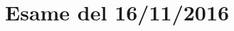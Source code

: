 \documentclass[\main/main.tex]{subfiles}
\begin{document}
\section{Esame del 16/11/2016}

\end{document}
